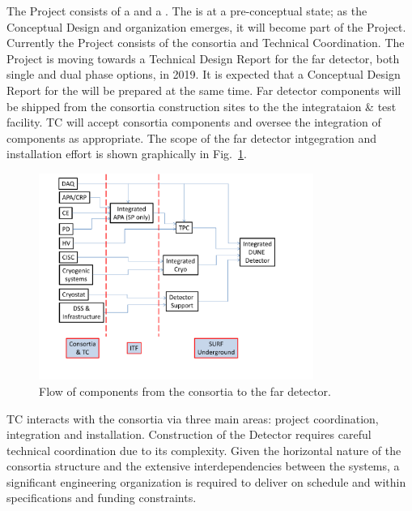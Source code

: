 The  Project consists of a  and a
. The  is at a pre-conceptual state; as the
Conceptual Design and organization emerges, it will become part of the
 Project. Currently the  Project consists of
the   consortia and Technical Coordination.  The
 Project is moving towards a Technical Design Report for
the far detector, both single and dual phase options, in 2019. It is
expected that a Conceptual Design Report for the  will be
prepared at the same time. Far detector components will be shipped
from the consortia construction sites to the the integrataion \& test
facility. TC will accept consortia components and oversee the
integration of components as appropriate. The scope of the
far detector intgegration and installation effort is shown graphically in
Fig.~\ref{fig:TC_flow}.
\begin{figure}[htb]
  \begin{center}
    \includegraphics[width=0.8\textwidth]{far-detector-generic/figures/DUNE_deliverable_flow}
    \caption{Flow of components from the consortia to the far detector.}
    \label{fig:TC_flow}
  \end{center}
\end{figure}

TC interacts with the consortia via three main areas: project
coordination, integration and installation.  Construction of the
 Detector requires careful technical coordination due to
its complexity.  Given the horizontal nature of the consortia
structure and the extensive interdependencies between the systems, a
significant engineering organization is required to deliver
 on schedule and within specifications and funding
constraints.


